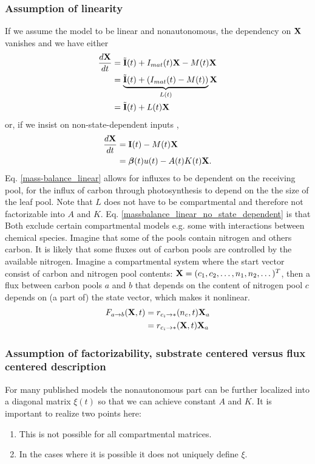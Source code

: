 \subsubsection{Assumption of linearity}
If we assume the model to be linear and nonautonomous, the dependency on $\mathbf{X}$ vanishes and we have
either
\begin{align}
\frac{d \mathbf{X}}{d t}
  &=\tilde{\mathbf{I}}(t)+I_{mat}(t)\mathbf{X} - M(t) \mathbf{X}  \nonumber
  \\
  &=\underbrace{\tilde{\mathbf{I}}(t)+(I_{mat}(t) - M(t))}_{L(t)} \mathbf{X} \label{massbalance_linear} \\
  &=\tilde{\mathbf{I}}(t)+L(t) \mathbf{X} \nonumber
\end{align}
or, if we insist on non-state-dependent inputs ,
\begin{align}
\frac{d \mathbf{X}}{d t}
  &=\mathbf{I}(t) - M(t) \mathbf{X} \label{massbalance_linear_no_state_dependent}
  \\
  &= \bm{\beta}(t)u(t) - A(t) K(t) \mathbf{X} \nonumber.
\end{align} 
Eq. \eqref{mass-balance_linear} allows for influxes to be dependent on the receiving pool, \eg for the influx of carbon through photosynthesis to depend on the the size of the leaf pool. Note that $L$ does not have to be compartmental and therefore not factorizable into $A$ and $K$.
Eq. \eqref{massbalance_linear_no_state_dependent} is that 
Both  exclude certain compartmental models e.g. some with interactions between chemical species. 
Imagine that some of the pools contain nitrogen and others carbon.
It is likely that some fluxes out of carbon pools are controlled by the
available nitrogen.  
Imagine a compartmental system where the start vector
consist of carbon and nitrogen pool contents: $\mathbf{X}=(c_1,c_2,\dots,
n_1,n_2,\dots )^T$, then a flux between carbon pools $a$ and $b$ that
depends on the content of nitrogen pool $c$ depends on (a part of) the
state vector, which makes it nonlinear. 
\begin{align*}
F_{a \rightarrow b} (\mathbf{X},t)  &= r_{c_i \rightarrow *}(n_c,t) \mathbf{X}_a \\
                            &= r_{c_i \rightarrow *}(\mathbf{X},t) \mathbf{X}_a
\end{align*}


\subsubsection{Assumption of factorizability, substrate centered versus flux centered description}
For many published models the nonautonomous part  can be further localized into a diagonal matrix $\xi(t)$ so that we can achieve constant $A$ and $K$. It is important to realize two points here:
\begin{enumerate}
\item \label{substrate_xi}
  This is not possible for all compartmental matrices.
\item  \label{define_xi}
  In the cases where it is possible it does not uniquely define $\xi$.
\end{enumerate}


